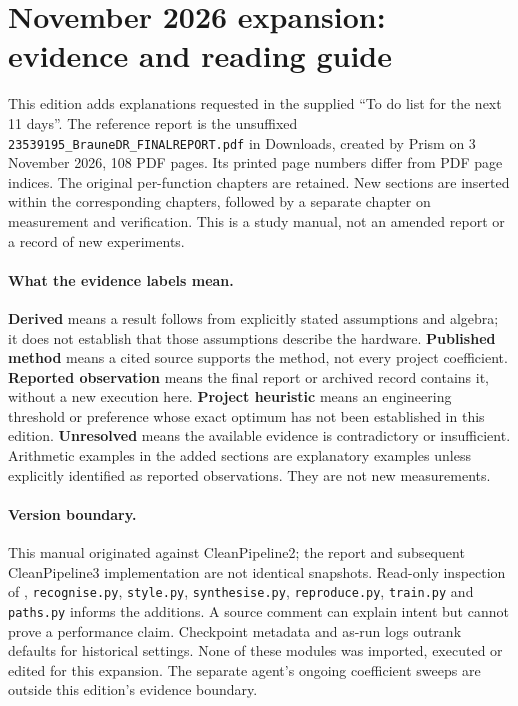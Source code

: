 \section{November 2026 expansion: evidence and reading guide}
\label{sec:expansion-guide}
This edition adds explanations requested in the supplied ``To do list for the
next 11 days''. The reference report is the unsuffixed
\texttt{23539195\_BrauneDR\_FINALREPORT.pdf} in Downloads, created by Prism on
3 November 2026, 108 PDF pages. Its printed page numbers differ from PDF page
indices. The original per-function chapters are retained. New sections are
inserted within the corresponding chapters, followed by a separate chapter on
measurement and verification. This is a study manual, not an amended report or
a record of new experiments.

\paragraph{What the evidence labels mean.}
\textbf{Derived} means a result follows from explicitly stated assumptions and
algebra; it does not establish that those assumptions describe the hardware.
\textbf{Published method} means a cited source supports the method, not every
project coefficient. \textbf{Reported observation} means the final report or
archived record contains it, without a new execution here.
\textbf{Project heuristic} means an engineering threshold or preference whose
exact optimum has not been established in this edition.
\textbf{Unresolved} means the available evidence is contradictory or insufficient.
Arithmetic examples in the added sections are explanatory examples unless
explicitly identified as reported observations. They are not new measurements.

\paragraph{Version boundary.}
This manual originated against CleanPipeline2; the report and subsequent
CleanPipeline3 implementation are not identical snapshots. Read-only inspection
of , \texttt{recognise.py},
\texttt{style.py}, \texttt{synthesise.py}, \texttt{reproduce.py},
\texttt{train.py} and \texttt{paths.py} informs the additions. A source comment
can explain intent but cannot prove a performance claim. Checkpoint metadata
and as-run logs outrank defaults for historical settings. None of these modules
was imported, executed or edited for this expansion. The separate agent's
ongoing coefficient sweeps are outside this edition's evidence boundary.

